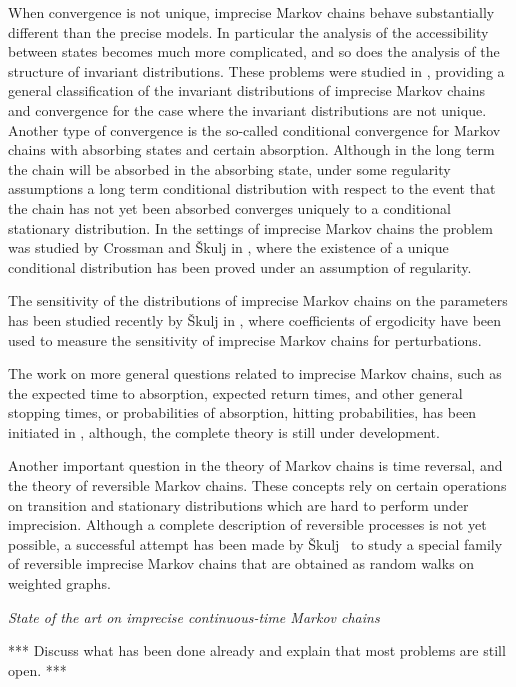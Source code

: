 \documentclass[11pt,dvipsnames,usenames,a4paper]{article}
\begin{document}
When convergence is not unique, imprecise Markov chains behave substantially different than the precise models. In particular the analysis of the accessibility between states becomes much more complicated, and so does the analysis of the structure of invariant distributions. These problems were studied in \cite{skulj:13b}, providing a general classification of the invariant distributions of imprecise Markov chains and convergence for the case where the invariant distributions are not unique. Another type of convergence is the so-called conditional convergence for Markov chains with absorbing states and certain absorption. Although in the long term the chain will be absorbed in the absorbing state, under some regularity assumptions a long term conditional distribution with respect to the event that the chain has not yet been absorbed converges uniquely to a conditional stationary distribution. In the settings of imprecise Markov chains the problem was studied by Crossman and Škulj in \cite{Crossman:2010}, where the existence of a unique conditional distribution has been proved under an assumption of regularity. 

The sensitivity of the distributions of imprecise Markov chains on the parameters has been studied recently by Škulj in \cite{skulj:2016b}, where coefficients of ergodicity have been used to measure the sensitivity of imprecise Markov chains for perturbations. 

The work on more general questions related to imprecise Markov chains, such as the expected time to absorption, expected return times, and other general stopping times, or probabilities of absorption, hitting probabilities, has been initiated in \cite{troffaes:2013, cooman2015:markovergodic}, although, the complete theory is still under development. 

Another important question in the theory of Markov chains is time reversal, and the theory of reversible Markov chains. These concepts rely on certain operations on transition and stationary distributions which are hard to perform under imprecision. Although a complete description of reversible processes is not yet possible, a successful attempt has been made by Škulj~\cite{skulj:16} to study a special family of reversible imprecise Markov chains that are obtained as random walks on weighted graphs. 


\emph{State of the art on imprecise continuous-time Markov chains}

*** Discuss what has been done already and explain that most problems are still open. ***
\end{document}
